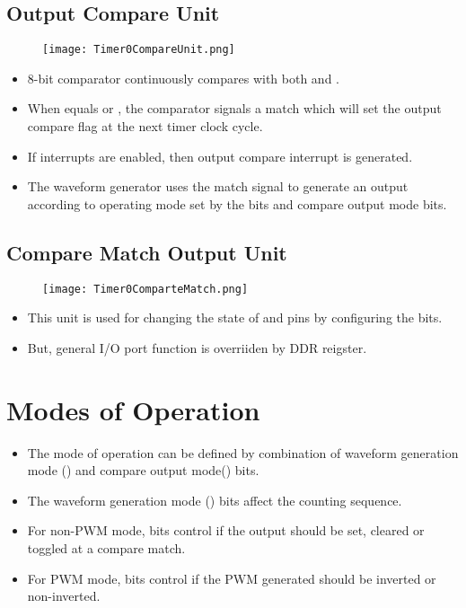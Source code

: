 \documentclass{article}
\begin{document}
\subsection{Output Compare Unit}
\begin{figure}[H]
    \begin{center}
        \texttt{[image: Timer0CompareUnit.png]}
    \end{center}
\end{figure}
\begin{itemize}
    \item 8-bit comparator continuously compares  with both  and .
    \item When  equals  or , the comparator signals a match which will set the output compare flag at the next timer clock cycle.
    \item If interrupts are enabled, then output compare interrupt is generated.
    \item The waveform generator uses the match signal to generate an output according to operating mode set by the  bits and compare output mode  bits.
\end{itemize}

\subsection{Compare Match Output Unit}
\begin{figure}[H]
    \begin{center}
        \texttt{[image: Timer0ComparteMatch.png]}
    \end{center}
\end{figure}
\begin{itemize}
    \item This unit is used for changing the state of  and  pins by configuring the  bits.
    \item But, general I/O port function is overriiden by DDR reigster.
\end{itemize}

\section{Modes of Operation}
\begin{itemize}
    \item The mode of operation can be defined by combination of waveform generation mode () and compare output mode() bits.
    \item The waveform generation mode () bits affect the counting sequence.
    \item For non-PWM mode,  bits control if the output should be set, cleared or toggled at a compare match.
    \item For PWM mode,  bits control if the PWM generated should be inverted or non-inverted.
\end{itemize}
\end{document}

